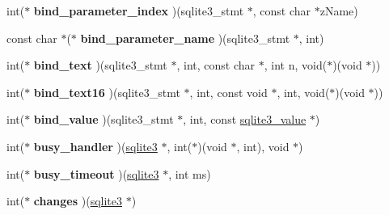 \begin{DoxyCompactItemize}
\item 
\hypertarget{structsqlite3__api__routines_a1985681b1e13047a8aae17676debb39d}{int($\ast$ {\bfseries bind\-\_\-parameter\-\_\-index} )(sqlite3\-\_\-stmt $\ast$, const char $\ast$z\-Name)}\label{structsqlite3__api__routines_a1985681b1e13047a8aae17676debb39d}

\item 
\hypertarget{structsqlite3__api__routines_ae313944795333d76400e484b08027b01}{const char $\ast$($\ast$ {\bfseries bind\-\_\-parameter\-\_\-name} )(sqlite3\-\_\-stmt $\ast$, int)}\label{structsqlite3__api__routines_ae313944795333d76400e484b08027b01}

\item 
\hypertarget{structsqlite3__api__routines_a4e64c1e01f7317ce0924683bf26b165a}{int($\ast$ {\bfseries bind\-\_\-text} )(sqlite3\-\_\-stmt $\ast$, int, const char $\ast$, int n, void($\ast$)(void $\ast$))}\label{structsqlite3__api__routines_a4e64c1e01f7317ce0924683bf26b165a}

\item 
\hypertarget{structsqlite3__api__routines_a4613c5fa0a1fac009914ddd0f4415cfd}{int($\ast$ {\bfseries bind\-\_\-text16} )(sqlite3\-\_\-stmt $\ast$, int, const void $\ast$, int, void($\ast$)(void $\ast$))}\label{structsqlite3__api__routines_a4613c5fa0a1fac009914ddd0f4415cfd}

\item 
\hypertarget{structsqlite3__api__routines_aca47715615cc037cd2f850e8c87cd68d}{int($\ast$ {\bfseries bind\-\_\-value} )(sqlite3\-\_\-stmt $\ast$, int, const \hyperlink{struct_mem}{sqlite3\-\_\-value} $\ast$)}\label{structsqlite3__api__routines_aca47715615cc037cd2f850e8c87cd68d}

\item 
\hypertarget{structsqlite3__api__routines_a4dd578712242bb36acf8568f1c0da278}{int($\ast$ {\bfseries busy\-\_\-handler} )(\hyperlink{structsqlite3}{sqlite3} $\ast$, int($\ast$)(void $\ast$, int), void $\ast$)}\label{structsqlite3__api__routines_a4dd578712242bb36acf8568f1c0da278}

\item 
\hypertarget{structsqlite3__api__routines_a403a82d983e3a60444761e4f78d6269c}{int($\ast$ {\bfseries busy\-\_\-timeout} )(\hyperlink{structsqlite3}{sqlite3} $\ast$, int ms)}\label{structsqlite3__api__routines_a403a82d983e3a60444761e4f78d6269c}

\item 
\hypertarget{structsqlite3__api__routines_a1379bef0cb6e5e352dc26a34e2d02477}{int($\ast$ {\bfseries changes} )(\hyperlink{structsqlite3}{sqlite3} $\ast$)}\label{structsqlite3__api__routines_a1379bef0cb6e5e352dc26a34e2d02477}


\end{DoxyCompactItemize}
